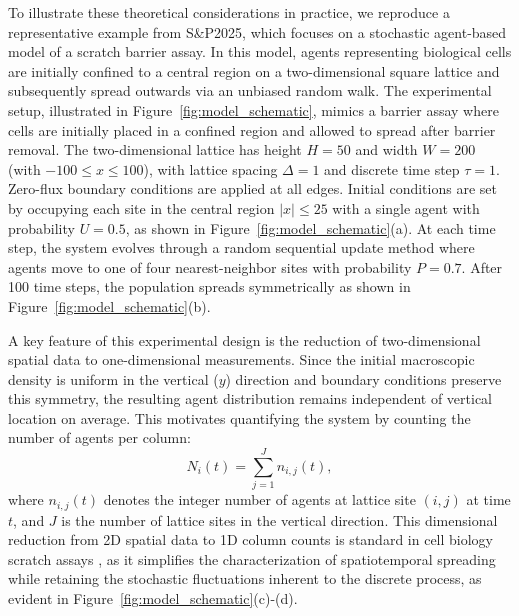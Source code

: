 \documentclass{article}
\begin{document}
To illustrate these theoretical considerations in practice, we reproduce a representative example from S\&P2025, which focuses on a stochastic agent-based model of a scratch barrier assay. In this model, agents representing biological cells are initially confined to a central region on a two-dimensional square lattice and subsequently spread outwards via an unbiased random walk. The experimental setup, illustrated in Figure~\ref{fig:model_schematic}, mimics a barrier assay where cells are initially placed in a confined region and allowed to spread after barrier removal. The two-dimensional lattice has height $H=50$ and width $W=200$ (with $-100 \leq x \leq 100$), with lattice spacing $\Delta=1$ and discrete time step $\tau=1$. Zero-flux boundary conditions are applied at all edges. Initial conditions are set by occupying each site in the central region $|x| \leq 25$ with a single agent with probability $U=0.5$, as shown in Figure~\ref{fig:model_schematic}(a). At each time step, the system evolves through a random sequential update method where agents move to one of four nearest-neighbor sites with probability $P=0.7$. After 100 time steps, the population spreads symmetrically as shown in Figure~\ref{fig:model_schematic}(b).

A key feature of this experimental design is the reduction of two-dimensional spatial data to one-dimensional measurements. Since the initial macroscopic density is uniform in the vertical ($y$) direction and boundary conditions preserve this symmetry, the resulting agent distribution remains independent of vertical location on average. This motivates quantifying the system by counting the number of agents per column:
\begin{equation}
	N_i(t) = \sum_{j=1}^{J} n_{i,j}(t),
\end{equation}
where $n_{i,j}(t)$ denotes the integer number of agents at lattice site $(i,j)$ at time $t$, and $J$ is the number of lattice sites in the vertical direction. This dimensional reduction from 2D spatial data to 1D column counts is standard in cell biology scratch assays \citep{Jin2016}, as it simplifies the characterization of spatiotemporal spreading while retaining the stochastic fluctuations inherent to the discrete process, as evident in Figure~\ref{fig:model_schematic}(c)-(d).
\end{document}
